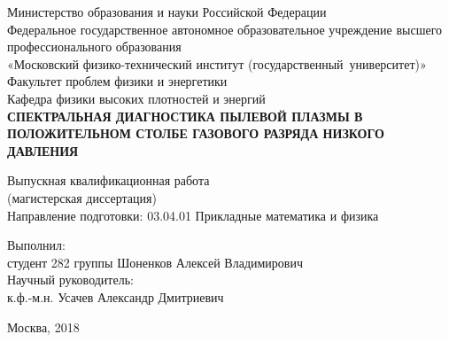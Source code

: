 \begin{center}
    Министерство образования и науки Российской Федерации\\
    Федеральное государственное автономное образовательное учреждение высшего профессионального образования\\
    «Московский физико-технический институт \pt(государственный~университет)»\\[10mm]

    Факультет проблем физики и энергетики\\[5mm]
    Кафедра физики высоких плотностей и энергий\\[15mm]

    \textbf{
        СПЕКТРАЛЬНАЯ ДИАГНОСТИКА ПЫЛЕВОЙ ПЛАЗМЫ В ПОЛОЖИТЕЛЬНОМ СТОЛБЕ ГАЗОВОГО РАЗРЯДА НИЗКОГО ДАВЛЕНИЯ\\[10mm]
    }

    Выпускная квалификационная работа\\
    (магистерская диссертация)\\[5mm]

Направление подготовки: 03.04.01 Прикладные математика и физика\\[15mm]
\end{center}
Выполнил:\\
студент 282 группы \uline{\hfill} Шоненков Алексей Владимирович\\[10mm]
Научный руководитель:\\
к.ф.-м.н. \uline{\hfill} Усачев Александр Дмитриевич\\[10mm]
\vfill

\begin{center}
    Москва, 2018
\end{center}

\thispagestyle{empty}
